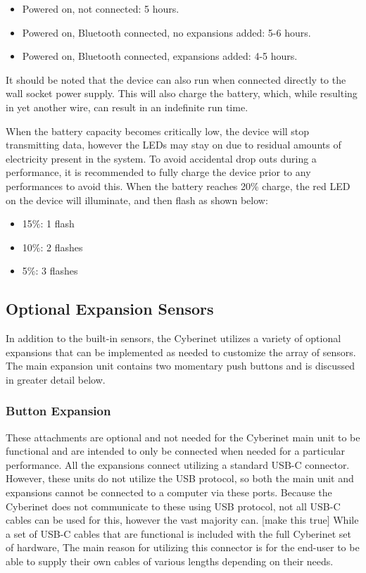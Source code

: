 \begin{itemize}
    \item Powered on, not connected: 5 hours.
    \item Powered on, Bluetooth connected, no expansions added: 5-6 hours.
    \item Powered on, Bluetooth connected, expansions added: 4-5 hours.
\end{itemize}


It should be noted that the device can also run when connected directly to the wall socket power supply. This will also charge the battery, which, while resulting in yet another wire, can result in an indefinite run time.

When the battery capacity becomes critically low, the device will stop transmitting data, however the LEDs may stay on due to residual amounts of electricity present in the system. To avoid accidental drop outs during a performance, it is recommended to fully charge the device prior to any performances to avoid this. When the battery reaches 20\% charge, the red LED on the device will illuminate, and then flash as shown below:

\begin{itemize}
    \item 15\%: 1 flash
    \item 10\%: 2 flashes
    \item 5\%: 3 flashes
\end{itemize}


\subsection{Optional Expansion Sensors}
In addition to the built-in sensors, the Cyberinet utilizes a variety of optional expansions that can be implemented as needed to customize the array of sensors. The main expansion unit contains two momentary push buttons and is discussed in greater detail below.

\subsubsection{Button Expansion}

These attachments are optional and not needed for the Cyberinet main unit to be functional and are intended to only be connected when needed for a particular performance. All the expansions connect utilizing a standard USB-C connector. However, these units do not utilize the USB protocol, so both the main unit and expansions cannot be connected to a computer via these ports. Because the Cyberinet does not communicate to these using USB protocol, not all USB-C cables can be used for this, however the vast majority can. [make this true] While a set of USB-C cables that are functional is included with the full Cyberinet set of hardware, The main reason for utilizing this connector is for the end-user to be able to supply their own cables of various lengths depending on their needs. 

